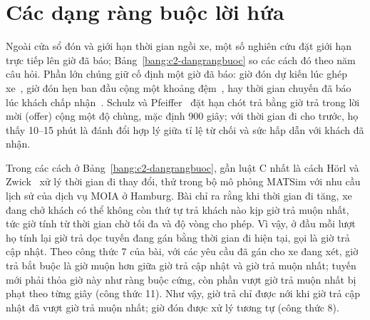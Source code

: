 \section{Các dạng ràng buộc lời hứa}
\label{muc:c2-rangbuoc}

Ngoài cửa sổ đón và giới hạn thời gian ngồi xe, một số nghiên cứu đặt giới hạn trực tiếp lên giờ đã báo;
Bảng~\ref{bang:c2-dangrangbuoc} so các cách đó theo năm câu hỏi. Phần lớn chúng giữ cố định một giờ đã báo: giờ đón
dự kiến lúc ghép xe~\cite{alonsomora2017}, giờ đón hẹn ban đầu cộng một khoảng đệm~\cite{lu2024}, hay thời gian
chuyến đã báo lúc khách chấp nhận~\cite{laupichler2026}. Schulz và Pfeiffer~\cite{schulz2026} đặt hạn chót trả bằng
giờ trả trong lời mời (offer) cộng một độ chùng, mặc định 900 giây; với thời gian đi cho trước, họ thấy 10--15 phút là
đánh đổi hợp lý giữa tỉ lệ từ chối và sức hấp dẫn với khách đã nhận.

Trong các cách ở Bảng~\ref{bang:c2-dangrangbuoc}, gần luật C nhất là cách Hörl và Zwick~\cite{horl2022} xử lý thời
gian đi thay đổi, thử trong bộ mô phỏng MATSim với nhu cầu lịch sử của dịch vụ MOIA ở Hamburg. Bài chỉ ra rằng khi
thời gian đi tăng, xe đang chở khách có thể không còn thứ tự trả khách nào kịp giờ trả muộn nhất, tức giờ tính từ thời
gian chờ tối đa và độ vòng cho phép. Vì vậy, ở đầu mỗi lượt họ tính lại giờ trả dọc tuyến đang gán bằng thời gian đi hiện
tại, gọi là giờ trả cập nhật. Theo công thức 7 của bài, với các yêu cầu đã gán cho xe đang xét, giờ trả bắt buộc là
giờ muộn hơn giữa giờ trả cập nhật và giờ trả muộn nhất; tuyến mới phải thỏa giờ này như ràng buộc cứng, còn phần vượt
giờ trả muộn nhất bị phạt theo từng giây (công thức 11). Như vậy, giờ trả chỉ được nới khi giờ trả cập nhật đã vượt
giờ trả muộn nhất; giờ đón được xử lý tương tự (công thức 8).

